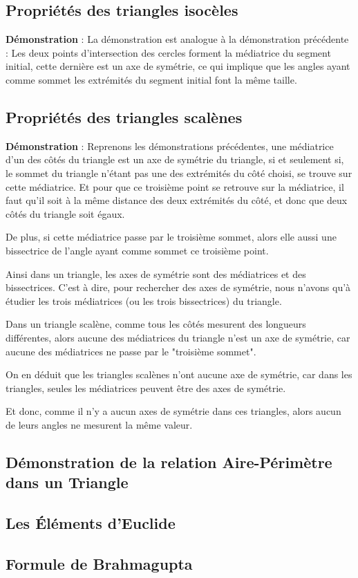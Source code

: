 \documentclass[a4paper, twoside]{article}
\begin{document}
\subsection*{Propriétés des triangles isocèles} \label{propriete_triangle_isocele}

\textbf{Démonstration} : La démonstration est analogue à la démonstration précédente :
Les deux points d'intersection des cercles forment la médiatrice du segment initial,
cette dernière est un axe de symétrie,
ce qui implique que les angles ayant comme sommet les extrémités du segment initial font la même taille.

\subsection*{Propriétés des triangles scalènes} \label{propriete_triangle_scalene}

\textbf{Démonstration} : Reprenons les démonstrations précédentes,
une médiatrice d'un des côtés du triangle est un axe de symétrie du triangle,
si et seulement si, le sommet du triangle n'étant pas une des extrémités du côté choisi,
se trouve sur cette médiatrice. Et pour que ce troisième point se retrouve sur la médiatrice,
il faut qu'il soit à la même distance des deux extrémités du côté,
et donc que deux côtés du triangle soit égaux.

De plus, si cette médiatrice passe par le troisième sommet,
alors elle aussi une bissectrice de l'angle ayant comme sommet ce troisième point.

Ainsi dans un triangle, les axes de symétrie sont des médiatrices et des bissectrices.
C'est à dire, pour rechercher des axes de symétrie, nous n'avons qu'à étudier les trois
médiatrices (ou les trois bissectrices) du triangle.

Dans un triangle scalène, comme tous les côtés mesurent des longueurs différentes,
alors aucune des médiatrices du triangle n'est un axe de symétrie,
car aucune des médiatrices ne passe par le "troisième sommet".

On en déduit que les triangles scalènes n'ont aucune axe de symétrie,
car dans les triangles, seules les médiatrices peuvent être des axes de symétrie.

Et donc, comme il n'y a aucun axes de symétrie dans ces triangles,
alors aucun de leurs angles ne mesurent la même valeur.

\subsection*{Démonstration de la relation Aire-Périmètre dans un Triangle} \label{relation_aire_perim_triangle}

\subsection*{Les Éléments d'Euclide} \label{euclide_element}

\subsection*{Formule de Brahmagupta} \label{formule_de_Brahmagupta}

\end{document}
